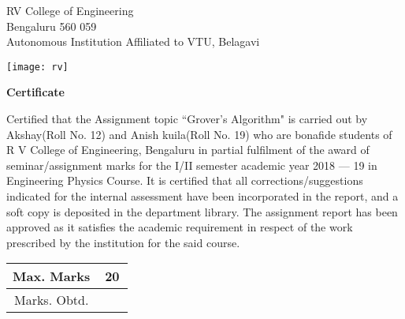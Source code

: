 \documentclass[a4paper]{article}
\begin{document}
\begin{titlepage}
   \begin{center}
       \vspace*{1cm}

       RV College of Engineering\\
       Bengaluru 560 059\\
       Autonomous Institution Affiliated to VTU, Belagavi

       \vspace{2.5cm}

       \texttt{[image: rv]}
       \vspace{0.5cm}

       \textbf{Certificate}
   \end{center}

       \vspace{0.5cm}

       Certified that the Assignment topic ``Grover’s Algorithm" is carried out
       by Akshay(Roll No. 12) and Anish kuila(Roll No. 19) who are bonafide
       students of R V College of Engineering, Bengaluru in partial fulfilment
       of the award of seminar/assignment marks for the I/II semester academic
       year 2018 --- 19 in Engineering Physics Course. It is certified that all
       corrections/suggestions indicated for the internal assessment have been
       incorporated in the report, and a soft copy is deposited in the
       department library. The assignment report has been approved as it
       satisfies the academic requirement in respect of the work prescribed by
       the institution for the said course.

       \vspace{1.5cm}

       \begin{table}[h!]
           \begin{tabular}{ |c|c| }
               \hline
               Max. Marks & 20\\
               \hline
               Marks. Obtd. & ~~~\\
               \hline
           \end{tabular}
       \end{table}

       \vspace{0.8cm}

\end{titlepage}

\tableofcontents
\pagebreak
\end{document}
